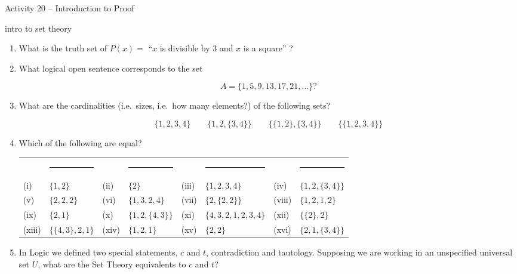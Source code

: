 \documentclass{amsart}
\begin{document}
\thispagestyle{empty}

\centerline{\Large Activity 20 -- Introduction to Proof}
\centerline{\large intro to set theory}

\bigskip
\Large


\begin{enumerate}

\item What is the truth set of $P(x) = $ ``$x$ is divisible by $3$ and $x$ is a square'' ?

\vfill

\item What logical open sentence corresponds to the set 

\[ A = \{ 1, 5, 9, 13, 17, 21, \ldots \} ? \]

\vfill

\item What are the cardinalities (i.e.\ sizes, i.e.\ how many elements?) of the following sets?

\[  \{1,2,3,4\} \qquad \{1,2,\{3,4\}\} \qquad \{\{1,2\},\{3,4\}\} \qquad \{\{1,2,3,4\}\}  \]

\vfill

\newpage

\item Which of the following are equal?

\hspace{-1.25in}\begin{tabular}{llllllll}
 & \rule{1.1in}{0pt} &  & \rule{1.1in}{0pt} &  & \rule{1.1in}{0pt} & & \rule{1.1in}{0pt} \\
\rule[-6pt]{0pt}{24pt} (i) & $\{1,2\}$ & (ii) & $\{2\}$ & (iii) & $\{1,2,3,4\}$ & (iv) & $\{1,2,\{3,4\}\}$ \\
\rule[-6pt]{0pt}{24pt} (v) & $\{2,2,2\}$ & (vi) & $\{1,3,2,4\}$ & (vii) & $\{2,\{2,2\}\}$ & (viii) & $\{1,2,1,2\}$\\
\rule[-6pt]{0pt}{24pt} (ix) & $\{2,1\}$ & (x) & $\{1,2,\{4,3\}\}$ & (xi) & $\{4,3,2,1,2,3,4\}$ & (xii) & $\{\{2\},2\}$ \\
\rule[-6pt]{0pt}{24pt} (xiii) & $\{\{4,3\},2,1\}$ & (xiv) & $\{1,2,1\}$ & (xv) & $\{2,2\}$ & (xvi) & $\{2,1,\{3,4\}\}$\\
\end{tabular}

\vfill



\item In Logic we defined two special statements, $c$ and $t$, contradiction and tautology.  Supposing we are working in an unspecified universal set $U$, what are the Set Theory equivalents to $c$ and $t$?


\end{enumerate}
\end{document}
